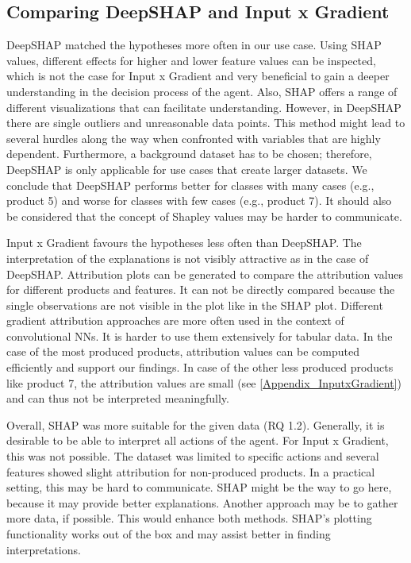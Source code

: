 \subsection{Comparing DeepSHAP and Input x Gradient}
DeepSHAP matched the hypotheses more often in our use case. Using SHAP values, different effects for higher and lower feature values can be inspected, which is not the case for Input x Gradient and very beneficial to gain a deeper understanding in the decision process of the agent. Also, SHAP offers a range of different visualizations that can facilitate understanding. However, in DeepSHAP there are single outliers and unreasonable data points. This method might lead to several hurdles along the way when confronted with variables that are highly dependent. Furthermore, a background dataset has to be chosen; therefore, DeepSHAP is only applicable for use cases that create larger datasets. We conclude that DeepSHAP performs better for classes with many cases (e.g., product 5) and worse for classes with few cases (e.g., product 7). It should also be considered that the concept of Shapley values may be harder to communicate.

Input x Gradient favours the hypotheses less often than DeepSHAP. The interpretation of the explanations is not visibly attractive as in the case of DeepSHAP. Attribution plots can be generated to compare the attribution values for different products and features. It can not be directly compared because the single observations are not visible in the plot like in the SHAP plot. Different gradient attribution approaches are more often used in the context of convolutional NNs. It is harder to use them extensively for tabular data. In the case of the most produced products, attribution values can be computed efficiently and support our findings. In case of the other less produced products like product 7, the attribution values are small (see \ref{Appendix_InputxGradient}) and can thus not be interpreted meaningfully.

Overall, SHAP was more suitable for the given data (RQ 1.2). Generally, it is desirable to be able to interpret all actions of the agent. For Input x Gradient, this was not possible. The dataset was limited to specific actions and several features showed slight attribution for non-produced products. In a practical setting, this may be hard to communicate. SHAP might be the way to go here, because it may provide better explanations. Another approach may be to gather more data, if possible. This would enhance both methods. SHAP's plotting functionality works out of the box and may assist better in finding interpretations.

